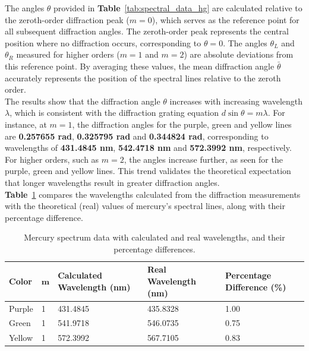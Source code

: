 \documentclass[a4paper,11pt]{article}
\begin{document}
The angles \(\theta\) provided in \textbf{Table}~\ref{tab:spectral_data_hg} are calculated relative to the zeroth-order diffraction peak (\(m = 0\)), which serves as the reference point for all subsequent diffraction angles. The zeroth-order peak represents the central position where no diffraction occurs, corresponding to \(\theta = 0\). The angles \(\theta_L\) and \(\theta_R\) measured for higher orders (\(m = 1\) and \(m = 2\)) are absolute deviations from this reference point. By averaging these values, the mean diffraction angle \(\bar{\theta}\) accurately represents the position of the spectral lines relative to the zeroth order.\\

The results show that the diffraction angle $\theta$ increases with increasing wavelength $\lambda$, which is consistent with the diffraction grating equation \( d \sin\theta = m\lambda \). For instance, at \( m = 1 \), the diffraction angles for the purple, green and yellow lines are \textbf{0.257655 rad}, \textbf{0.325795 rad} and \textbf{0.344824 rad}, corresponding to wavelengths of \textbf{431.4845 nm}, \textbf{542.4718 nm} and \textbf{572.3992 nm}, respectively. For higher orders, such as \( m = 2 \), the angles increase further, as seen for the purple, green and yellow lines. This trend validates the theoretical expectation that longer wavelengths result in greater diffraction angles.\\

\textbf{Table}~\ref{tab:mercury_spectrum} compares the wavelengths calculated from the diffraction measurements with the theoretical (real) values of mercury’s spectral lines, along with their percentage difference.

\begin{table}[ht]
  \centering
  \begin{tabular}{lllll}
  \toprule
  \textbf{Color} & \(\boldsymbol{m}\) & \textbf{Calculated Wavelength (nm)} & \textbf{Real Wavelength (nm)} & \textbf{Percentage Difference (\%)} \\
  \midrule
  Purple & 1 & 431.4845 & 435.8328 & 1.00 \\
  Green  & 1 & 541.9718 & 546.0735 & 0.75 \\
  Yellow & 1 & 572.3992 & 567.7105 & 0.83 \\
  \bottomrule
  \end{tabular}
  \caption{Mercury spectrum data with calculated and real wavelengths, and their percentage differences.\cite{physicsSE_second_order_spectra}\cite{nist_mercury_spectrum}}
  \label{tab:mercury_spectrum}
  \end{table}
\end{document}
